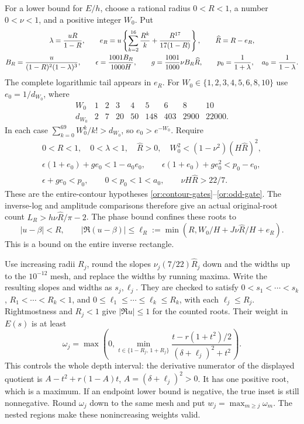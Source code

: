 For a lower bound for $E/h$, choose a rational radius
$0<R<1$, a number $0<\nu<1$, and a positive integer $W_0$.
Put
\begin{gather}
 \lambda=\frac{uR}{1-R},\qquad
 e_R=u\left\{\sum_{k=2}^{16}\frac{R^k}{k}
                    +\frac{R^{17}}{17(1-R)}\right\},\qquad
 \widehat R=R-e_R,\label{sm:extension-inverse}\\
 B_R=\frac{u}{(1-R)^2(1-\lambda)^3},\qquad
 \epsilon=\frac{1001B_R}{1000H},\qquad
 g=\frac{1001}{1000}\nu B_R\widehat R,\qquad
 p_0=\frac1{1+\lambda},\quad a_0=\frac1{1-\lambda}.
 \notag
\end{gather}
The complete logarithmic tail appears in $e_R$.
For $W_0\in\{1,2,3,4,5,6,8,10\}$ use $e_0=1/d_{W_0}$, where
\[
\begin{array}{c|rrrrrrrr}
 W_0&1&2&3&4&5&6&8&10\\ \hline
 d_{W_0}&2&7&20&50&148&403&2900&22000 .
\end{array}
\]
In each case $\sum_{k=0}^{69}W_0^k/k!>d_{W_0}$, so
$e_0>e^{-W_0}$. Require
\begin{gather}
 0<R<1,\quad 0<\lambda<1,\quad \widehat R>0,\quad
 W_0^2<(1-\nu^2)(H\widehat R)^2,\label{sm:extension-gates-a}\\
 \epsilon(1+e_0)+ge_0<1-a_0e_0,\qquad
 \epsilon(1+e_0)+ge_0^2<p_0-e_0,\label{sm:extension-gates-b}\\
 \epsilon+ge_0<p_0,\qquad
 0<p_0<1<a_0,\qquad \nu H\widehat R>22/7.
 \label{sm:extension-gates-c}
\end{gather}
These are the entire-contour hypotheses
\eqref{or:contour-gates}--\eqref{or:odd-gate}.
The inverse-log and amplitude comparisons therefore give an
actual original-root count
$L_R>h\nu\widehat R/\pi-2$.
The phase bound confines these roots to
\begin{equation}\label{sm:extension-width}
 |u-\beta|<R,\qquad
 |\Re(u-\beta)|\le
 \ell_R:=\min(R,W_0/H+J\nu\widehat R/H+e_R).
\end{equation}
This is a bound on the entire inverse rectangle.

Use increasing radii $R_j$, round the slopes
$\nu_j(7/22)\widehat R_j$ down and the widths up to the
$10^{-12}$ mesh, and replace the widths by running maxima.
Write the resulting slopes and widths as $s_j,\ell_j$.
They are checked to satisfy
$0<s_1<\cdots<s_k$, $R_1<\cdots<R_k<1$, and
$0\le\ell_1\le\cdots\le\ell_k\le R_k$, with each
$\ell_j\le R_j$.
Rightmostness and $R_j<1$ give $|\Re u|\le1$ for the counted roots.
Their weight in $E(s)$ is at least
\begin{equation}\label{sm:extension-weight}
 \omega_j=\max\left(0,\min_{t\in\{1-R_j,\,1+R_j\}}
       \frac{t-r(1+t^2)/2}{(\delta+\ell_j)^2+t^2}\right).
\end{equation}
This controls the whole depth interval: the derivative numerator
of the displayed quotient is
$A-t^2+r(1-A)t$, $A=(\delta+\ell_j)^2>0$.
It has one positive root, which is a maximum. If an endpoint
lower bound is negative, the true inset is still nonnegative.
Round $\omega_j$ down to the same mesh and put
$w_j=\max_{m\ge j}\omega_m$.
The nested regions make these nonincreasing weights valid.

